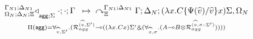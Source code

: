 
\[
\underset{
   \Pi(\m{agg}) = \forall_{\widehat{v}, \Sigma'}.
   (\defstwo{agg}{\widehat{v}}{\Sigma'} \lolli ((\lambda x. C x)\Sigma' \with (\forall_{\widehat{x}, \sigma}.
                                                (A \lolli B \otimes
                                                 \defstwo{agg}{\widehat{v}}{\sigma
                                                 ::\Sigma'}))))
}
{
\trans{
   \contstatea{\Delta_N}{\cdot ; \cdot}{\Gamma}{\Sigma}
}
{
   \derstatex{\Gamma}{\Delta_N}{\Xi}{\Gamma_{N1}}{\Delta_{N1}}{(\lambda x.
         C\{\Psi(\widehat{v})/\widehat{v}\} x) \Sigma,
      \Omega_N}
}
}
\]
